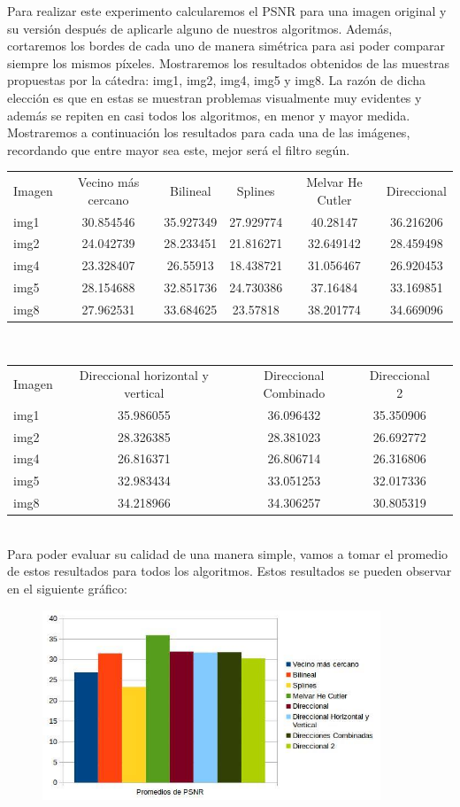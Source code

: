 \documentclass[10pt, a4paper]{article}
\begin{document}
Para realizar este experimento calcularemos el PSNR para una imagen original y su versi\'on despu\'es de aplicarle alguno de nuestros algoritmos. Adem\'as, cortaremos los bordes de cada uno de manera sim\'etrica para asi poder comparar siempre los mismos p\'ixeles. Mostraremos los resultados obtenidos de las muestras propuestas por la c\'atedra: img1, img2, img4, img5 y img8. La raz\'on de dicha elecci\'on es que en estas se muestran problemas visualmente muy evidentes y adem\'as se repiten en casi todos los algoritmos, en menor y mayor medida. Mostraremos a continuaci\'on los resultados para cada una de las im\'agenes, recordando que entre mayor sea este, mejor ser\'a el filtro seg\'un.
\\
\indent
\begin{tabular}{| l | c | c | c | c | c |}
	\hline
	Imagen & Vecino más cercano	& Bilineal	&Splines	& Melvar He Cutler	&Direccional\\
img1	&30.854546	&35.927349	&27.929774	&40.28147	&36.216206	\\
img2	&24.042739	&28.233451	&21.816271	&32.649142	&28.459498	\\
img4	&23.328407	&26.55913	&18.438721	&31.056467	&26.920453	\\
img5	&28.154688	&32.851736	&24.730386	&37.16484	&33.169851	\\
img8	&27.962531	&33.684625	&23.57818	&38.201774	&34.669096	\\
	\hline
\end{tabular}
\\
\indent
\begin{tabular}{| l | c | c | c | c |}
	\hline
Imagen & Direccional horizontal y vertical	&Direccional Combinado	&Direccional 2\\
img1	&35.986055	&36.096432	&35.350906\\
img2	&28.326385	&28.381023	&26.692772\\
img4	&26.816371	&26.806714	&26.316806\\
img5	&32.983434	&33.051253	&32.017336\\
img8	&34.218966	&34.306257	&30.805319\\
	\hline
\end{tabular}
\\
Para poder evaluar su calidad de una manera simple, vamos a tomar el promedio de estos resultados para todos los algoritmos. Estos resultados se pueden observar en el siguiente gr\'afico:

\begin{figure}[H]
  \centering
    \includegraphics[width=0.9\textwidth]{PSNR}
\end{figure}
\end{document}
